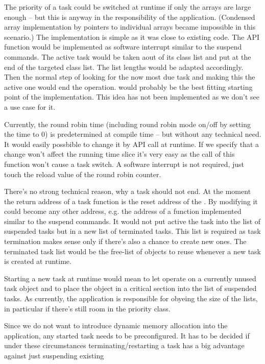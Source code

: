 The priority of a task could be switched at runtime if only the arrays are
large enough -- but this is anyway in the responsibility of the
application. (Condensed array implementation by pointers to individual
arrays became impossible in this scenario.) The implementation is simple
as it was close to existing code. The API function would be implemented as
software interrupt similar to the suspend commands. The active task would
be taken aout of its class list and put at the end of the targeted class
list. The list lengths would be adapted accordingly. Then the normal step
of looking for the now most due task and making this the active one would
end the operation.  would probably be the best fitting
starting point of the implementation. This idea has not been implemented
as we don't see a use case for it.

Currently, the round robin time (including round robin mode on/off by
setting the time to 0) is predetermined at compile time -- but without any
technical need. It would easily possbible to change it by API call at
runtime. If we specify that a change won't affect the running time slice
it's very easy as the call of this function won't cause a task switch. A
software interrupt is not required, just touch the reload value of the
round robin counter.

There's no strong technical reason, why a task should not end. At the
moment the return address of a task function is the reset address of the
\uC{}. By modifying  it could become any other
address, e.g. the address of a function implemented similar to the suspend
commands. It would not put active the task into the list of suspended
tasks but in a new list of terminated tasks. This list is required as task
termination makes sense only if there's also a chance to create new ones.
The terminated task list would be the free-list of objects to reuse
whenever a new task is created at runtime.

Starting a new task at runtime would mean to let 
operate on a currently unused task object and to place the object in a
critical section into the list of suspended tasks. As currently, the
application is responsible for obyeing the size of the lists, in
particular if there's still room in the priority class.

Since we do not want to introduce dynamic memory allocation into the
application, any started task needs to be preconfigured. It has to be
decided if under these circumstances terminating/restarting a task has a
big advantage against just suspending existing 
